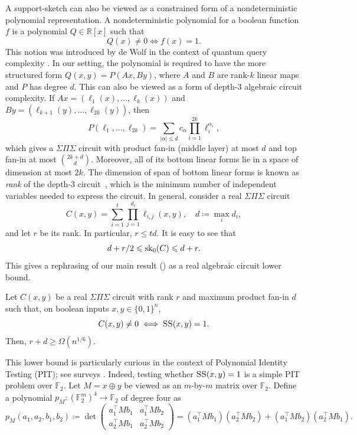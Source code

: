 \documentclass{article}
\begin{document}
A support-sketch can also be viewed as a constrained form of a nondeterministic polynomial representation. A nondeterministic polynomial for a boolean function $f$ is a polynomial $Q\in \mathbb{R}[x]$ such that
\[
    Q(x)\neq 0 \iff f(x)=1.
\] This notion was introduced by de Wolf in the context of quantum query complexity \cite{de2003nondeterministic}.
In our setting, the polynomial is required to have the more structured form $Q(x,y)=P(Ax,By)$, where $A$ and $B$ are rank-$k$ linear maps and $P$ has degree $d$. This can also be viewed as a form of depth-$3$ algebraic circuit complexity. 
If $Ax=(\ell_1(x),\ldots,\ell_k(x))$ and $By=(\ell_{k+1}(y),\ldots,\ell_{2k}(y))$, then 
\[
    P(\ell_1,\ldots,\ell_{2k}) = \sum_{|\alpha|\leq d} c_\alpha \prod_{i=1}^{2k}\ell_i^{\alpha_i},
\]
which gives a $\Sigma\Pi\Sigma$ circuit with product fan-in (middle layer) at most $d$ and top fan-in at most $\binom{2k+d}{d}.$ Moreover, all of its bottom linear forms lie in a space of
dimension at most $2k$. The dimension of span of bottom linear forms is known as \emph{rank} of the depth-3 circuit~\cite{saxena2011almost,shpilka2010arithmetic}, which is the minimum number of independent variables needed to express the circuit. 
In general, consider a real $\Sigma\Pi\Sigma$ circuit
\[
C(x,y)=
\sum_{i=1}^{t}
\prod_{j=1}^{d_i}
\ell_{i,j}(x,y), \quad
d\coloneqq\max_i d_i,
\]    
and let $r$ be its rank. In particular, $r\leq td$. It is easy to see that
\[d+r/2\leqslant \operatorname{sk}_0(C) \leqslant d+ r.\]
This gives a rephrasing of our main result () as a real algebraic circuit lower bound.
\begin{boxtheorem}
Let $C(x,y)$ be a real $\Sigma\Pi\Sigma$ circuit with rank $r$ and maximum product fan-in $d$ such that, on boolean inputs $x,y\in\{0,1\}^n$,
\[C(x,y)\neq 0 \iff \operatorname{\textsc{SS}}(x,y)=1.\]
Then, $r+d\geq \Omega(n^{1/6})$.
\end{boxtheorem}
This lower bound is particularly curious in the context of  Polynomial Identity Testing (PIT); see surveys \cite{saxena2014progress,shpilka2010arithmetic}. Indeed, 
testing whether $\operatorname{\textsc{SS}}(x,y)=1$ is a simple PIT problem over $\mathbb{F}_2$.
Let $M=x\oplus y$ be viewed as an $m$-by-$m$ matrix over $\mathbb{F}_2$. Define a polynomial  $p_{M}\colon (\mathbb{F}_2^m)^4\to \mathbb{F}_2$ of degree four as
\[p_{M}(a_1,a_2,b_1,b_2) \coloneqq \det \begin{pmatrix}  
a_1^\top M b_1 & a_1^\top M b_2\\
a_2^\top M b_1 & a_2^\top M b_2 
\end{pmatrix} = (a_1^\top M b_1)( a_2^\top M b_2)+(a_1^\top M b_2)(a_2^\top M b_1).\]
\end{document}
